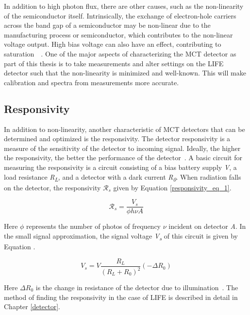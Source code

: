 In addition to high photon flux, there are other causes, such as the non-linearity of the semiconductor itself. Intrinsically, the exchange of electron-hole carriers across the band gap of a semiconductor may be non-linear due to the manufacturing process or semiconductor, which contributes to the non-linear voltage output. High bias voltage can also have an effect, contributing to saturation~\citep{current_measurement_MCTs}~\citep{MCT_linearity}. One of the major aspects of characterizing the MCT detector as part of this thesis is to take measurements and alter settings on the LIFE detector such that the non-linearity is minimized and well-known. This will make calibration and spectra from measurements more accurate.

\subsection {Responsivity}
In addition to non-linearity, another characteristic of MCT detectors that can be determined and optimized is the responsivity. The detector responsivity is a measure of the sensitivity of the detector to incoming signal. Ideally, the higher the responsivity, the better the performance of the detector~\citep{GLORIA_PhD}. A basic circuit for measuring the responsivity is a circuit consisting of a bias battery supply \textit{V}, a load resistance \textit{R\textsubscript{L}}, and a detector with a dark current \textit{R\textsubscript{0}}. When radiation falls on the detector, the responsivity $\mathcal{R}_s$ given by Equation \ref{responsivity_eq_1}.

\begin{equation} \label{responsivity_eq_1}
    \mathcal{R}_s = \frac{V_s}{\phi h \nu A}
\end{equation}

Here $\phi$ represents the number of photos of frequency $\nu$ incident on detector \textit{A}. In the small signal approximation, the signal voltage \textit{V\textsubscript{s}} of this circuit is given by Equation .

\begin{equation}
    V_s = V \frac{R_L}{(R_L+R_0)^2}(-\Delta R_0)
\end{equation}

Here $\Delta R_0$ is the change in resistance of the detector due to illumination~\citep{MCT_responsivity}. The method of finding the responsivity in the case of LIFE is described in detail in Chapter \ref{detector}.